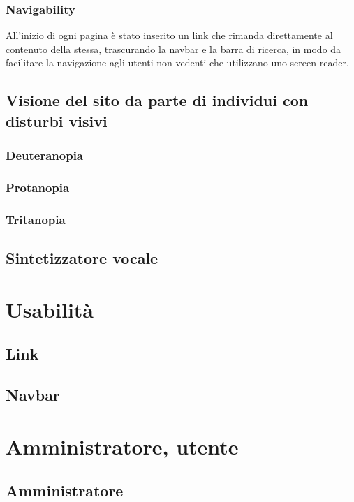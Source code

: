 \documentclass[10pt, a4paper]{article}
\begin{document}
\subsubsection{Navigability}
All'inizio di ogni pagina è stato inserito un link che rimanda direttamente al contenuto della stessa, trascurando la navbar e la barra di ricerca, in modo da facilitare la navigazione agli utenti non vedenti che utilizzano uno screen reader.

\subsection{Visione del sito da parte di individui con disturbi visivi}

\subsubsection{Deuteranopia}

\subsubsection{Protanopia}

\subsubsection{Tritanopia}

\subsection{Sintetizzatore vocale}

\section{Usabilità}

\subsection{Link}

\subsection{Navbar}

\section{Amministratore, utente}

\subsection{Amministratore}
\end{document}
